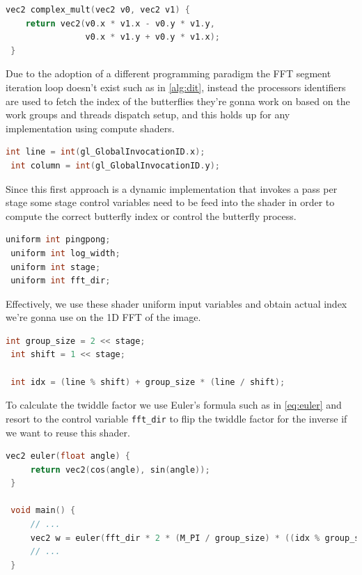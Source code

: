 \documentclass[
  oneside,
  11pt, a4paper,
  footinclude=true,
  headinclude=true,
  cleardoublepage=empty
]{scrbook}
\begin{document}
\begin{lstlisting}[language=C, caption={Complex multiplication}]
 vec2 complex_mult(vec2 v0, vec2 v1) {
 	return vec2(v0.x * v1.x - v0.y * v1.y,
 				v0.x * v1.y + v0.y * v1.x);
 }
\end{lstlisting}

Due to the adoption of a different programming paradigm the FFT segment iteration loop doesn't exist such as in \autoref{alg:dit}, instead the processors identifiers are used to fetch the index of the butterflies they're gonna work on based on the work groups and threads dispatch setup, and this holds up for any implementation using compute shaders.

\begin{lstlisting}[language=C, caption={Invocation indices}]
 int line = int(gl_GlobalInvocationID.x);
 int column = int(gl_GlobalInvocationID.y);
\end{lstlisting}

Since this first approach is a dynamic implementation that invokes a pass per stage some stage control variables need to be feed into the shader in order to compute the correct butterfly index or control the butterfly process.

\begin{lstlisting}[language=C, caption={Uniform control variables}]
 uniform int pingpong;
 uniform int log_width;
 uniform int stage;
 uniform int fft_dir;
\end{lstlisting}

Effectively, we use these shader uniform input variables and obtain actual index we're gonna use on the 1D FFT of the image.

\begin{lstlisting}[language=C, caption={FFT element index}]
 int group_size = 2 << stage;
 int shift = 1 << stage;
 
 int idx = (line % shift) + group_size * (line / shift);
\end{lstlisting}

To calculate the twiddle factor we use Euler's formula such as in \autoref{eq:euler} and resort to the control variable \texttt{fft\_dir} to flip the twiddle factor for the inverse if we want to reuse this shader.

\begin{lstlisting}[language=C,label={Euler's formula}]
 vec2 euler(float angle) {
     return vec2(cos(angle), sin(angle));
 }
 
 void main() {
     // ...
     vec2 w = euler(fft_dir * 2 * (M_PI / group_size) * ((idx % group_size) % shift));
     // ...
 }
\end{lstlisting}
\end{document}
